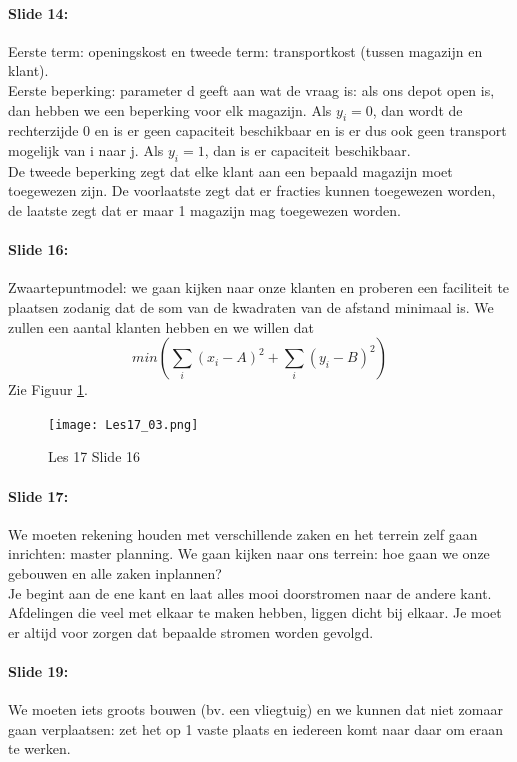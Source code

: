 \documentclass[10pt,a4paper]{report}
\begin{document}
\paragraph{Slide 14:} Eerste term: openingskost en tweede term: transportkost (tussen magazijn en klant).\\
Eerste beperking: parameter d geeft aan wat de vraag is: als ons depot open is, dan hebben we een beperking voor elk magazijn. Als $y_{i} = 0$, dan wordt de rechterzijde 0 en is er geen capaciteit beschikbaar en is er dus ook geen transport mogelijk van i naar j. Als $y_{i} = 1$, dan is er capaciteit beschikbaar.\\ 
De tweede beperking zegt dat elke klant aan een bepaald magazijn moet toegewezen zijn.
De voorlaatste zegt dat er fracties kunnen toegewezen worden, de laatste zegt dat er maar 1 magazijn mag toegewezen worden.

\paragraph{Slide 16:} Zwaartepuntmodel: we gaan kijken naar onze klanten en proberen een faciliteit te plaatsen zodanig dat de som van de kwadraten van de afstand minimaal is.
We zullen een aantal klanten hebben en we willen dat
 $$min (\sum_{i} (x_{i}-A)^2 + \sum_{i} (y_{i}-B)^2)$$
Zie Figuur \ref{les17_03}.

\begin{figure}[h!]
\centering
\texttt{[image: Les17\_03.png]}
\caption{Les 17 Slide 16} 
\label{les17_03}
\end{figure}

\paragraph{Slide 17:} We moeten rekening houden met verschillende zaken en het terrein zelf gaan inrichten: master planning. We gaan kijken naar ons terrein: hoe gaan we onze gebouwen en alle zaken inplannen?\\
Je begint aan de ene kant en laat alles mooi doorstromen naar de andere kant.
Afdelingen die veel met elkaar te maken hebben, liggen dicht bij elkaar. 
Je moet er altijd voor zorgen dat bepaalde stromen worden gevolgd.

\paragraph{Slide 19:} We moeten iets groots bouwen (bv. een vliegtuig) en we kunnen dat niet zomaar gaan verplaatsen: zet het op 1 vaste plaats en iedereen komt naar daar om eraan te werken. 
\end{document}
